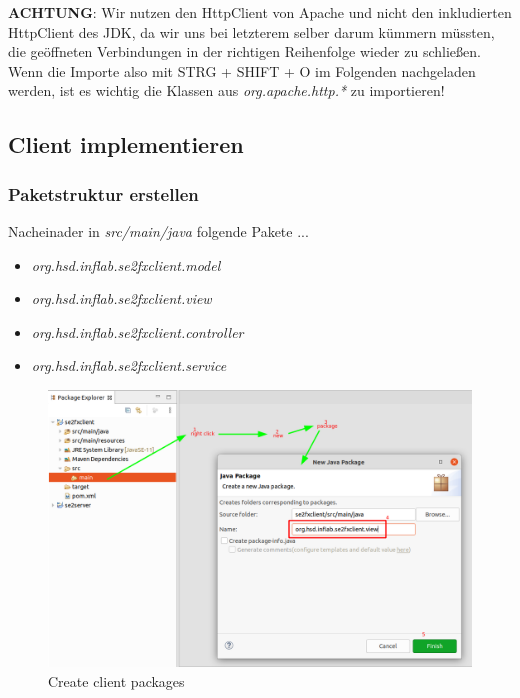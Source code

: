 \documentclass[11pt]{scrartcl}
\begin{document}
\textbf{ACHTUNG}: Wir nutzen den HttpClient von Apache und nicht den inkludierten
HttpClient des JDK, da wir uns bei letzterem selber 
darum kümmern müssten, die geöffneten Verbindungen in der richtigen Reihenfolge
wieder zu schließen. Wenn die Importe also mit STRG + SHIFT + O im Folgenden
nachgeladen werden, ist es wichtig die Klassen aus
\textit{org.apache.http.*} zu importieren!

\newpage
\subsection{Client implementieren}
\label{sec:implementclient}
\subsubsection{Paketstruktur erstellen}
\label{sec:createpaketstructure}

Nacheinader in \textit{src/main/java} folgende Pakete ...
\begin{itemize}
    \item \textit{org.hsd.inflab.se2fxclient.model}
    \item \textit{org.hsd.inflab.se2fxclient.view}
    \item \textit{org.hsd.inflab.se2fxclient.controller}
    \item \textit{org.hsd.inflab.se2fxclient.service}
\end{itemize}
\begin{figure}[!ht]
    \includegraphics[width=\linewidth]{images/eclipse19_client_package.png}
    \caption{Create client packages}
    \label{fig:createclientpackages}
\end{figure}
\end{document}
